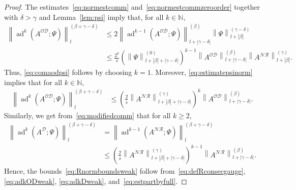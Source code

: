 \documentclass[10pt]{amsart}
\theoremstyle{definition}\newtheorem{defi}[theo]{Definition}\newtheorem{rema}[theo]{Remark}\newtheorem{exam}[theo]{Example}\newtheorem{nota}[theo]{Notation}
\DeclareMathOperator{\ad}{ad}
\newcommand{\N}{\mathbb N}
\newcommand{\CD}{\mathcal{D}}
\newcommand{\CN}{\mathcal{N}}
\newcommand{\CO}{\mathcal{O}}
\newcommand{\CR}{\mathcal{R}}
\newcommand{\COD}{{\CO\CD}}
\newcommand{\CNR}{{\CN\!\CR}}
\newcommand{\resc}{s}
\newcommand{\abs}[1]{\left\lvert #1 \right\rvert}
\newcommand{\snorm}[3]{\left\| #1\right\|_{#3}^{(#2)}}
\begin{document}
\begin{proof}
The estimates~\eqref{eq:normestcomm} and~\eqref{eq:normestcommzeroorder} together with $\delta>\gamma$ and Lemma~\ref{lem:psi} imply that, for all $k\in\N$,
\begin{equation}\label{eq:estmultcomm}
\begin{split}
\snorm{\ad^k\left(A^\COD;\Psi\right)}{\beta+\gamma - \delta}{l} &\le 2
\snorm{\ad^{k-1}\left(A^\COD;\Psi\right)}{\beta}{l + \abs{\gamma - \delta}} \snorm{\Psi}{\gamma - \delta}{l + \abs \beta} \\
&\le \frac{2^{k}}{\resc} \left(\snorm{\Psi}{0}{l + \abs\beta+\abs {\gamma-\delta}}\right)^{k-1} \snorm{A^\COD}{\beta}{l + \abs{\gamma - \delta}}\snorm{A^\CNR}{\gamma}{l + \abs{\beta}}.
\end{split}
\end{equation}
Thus, \eqref{eq:comaodpsi} follows by choosing $k = 1$. Moreover, \eqref{eq:estimatepsinorm} implies that for all $k\in\N$,
\begin{equation}\label{eq:adkODweak}
\begin{split}
\snorm{\ad^k\left(A^\COD;\Psi\right)}{\beta+\gamma - \delta}{l} &\le \left(\frac{2}{\resc}\snorm{A^{\CNR}}{\gamma}{l + \abs\beta+\abs {\gamma-\delta}}\right)^{k} \snorm{A^\COD}{\beta}{l + \abs{\gamma - \delta}}.
\end{split}
\end{equation}
Similarly, we get from~\eqref{eq:modifiedcomm} that for all $k\geq 2$,
\begin{equation}\label{eq:adkDweak}
\begin{split}
\snorm{\ad^k\left(A^\CD;\Psi\right)}{\beta+\gamma - \delta}{l} &=\snorm{\ad^{k-1}\left(A^\CNR;\Psi\right)}{\beta+\gamma - \delta}{l}\\
&\le \left(\frac{2}{\resc}\snorm{A^{\CNR}}{\gamma}{l + \abs\beta+\abs {\gamma-\delta}}\right)^{k-1} \snorm{A^\CNR}{\beta}{l + \abs{\gamma - \delta}}.
\end{split}
\end{equation}
Hence, the bounds~\eqref{eq:Rnormboundsweak} follow from~\eqref{eq:defRconsecgauge}, \eqref{eq:adkODweak}, \eqref{eq:adkDweak}, and~\eqref{eq:estpartbyfull}.
\end{proof}
\end{document}
